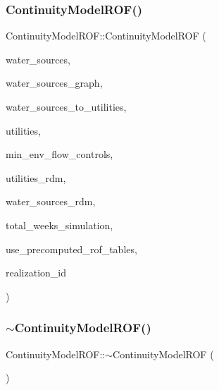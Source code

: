 \subsubsection{\texorpdfstring{Continuity\+Model\+R\+O\+F()}{ContinuityModelROF()}}
{\footnotesize\ttfamily Continuity\+Model\+R\+O\+F\+::\+Continuity\+Model\+R\+OF (\begin{DoxyParamCaption}\item[{vector$<$ \mbox{\hyperlink{classWaterSource}{Water\+Source}} $\ast$$>$}]{water\+\_\+sources,  }\item[{const \mbox{\hyperlink{classGraph}{Graph}} \&}]{water\+\_\+sources\+\_\+graph,  }\item[{const vector$<$ vector$<$ int $>$$>$ \&}]{water\+\_\+sources\+\_\+to\+\_\+utilities,  }\item[{vector$<$ \mbox{\hyperlink{classUtility}{Utility}} $\ast$$>$}]{utilities,  }\item[{vector$<$ \mbox{\hyperlink{classMinEnvFlowControl}{Min\+Env\+Flow\+Control}} $\ast$$>$}]{min\+\_\+env\+\_\+flow\+\_\+controls,  }\item[{vector$<$ double $>$ \&}]{utilities\+\_\+rdm,  }\item[{vector$<$ double $>$ \&}]{water\+\_\+sources\+\_\+rdm,  }\item[{unsigned long}]{total\+\_\+weeks\+\_\+simulation,  }\item[{const int}]{use\+\_\+precomputed\+\_\+rof\+\_\+tables,  }\item[{const unsigned long}]{realization\+\_\+id }\end{DoxyParamCaption})}

\mbox{\label{classContinuityModelROF_a0098bd7efa9e57a7ff0efc4c9b5aa340}} 
\subsubsection{\texorpdfstring{$\sim$\+Continuity\+Model\+R\+O\+F()}{~ContinuityModelROF()}}
{\footnotesize\ttfamily Continuity\+Model\+R\+O\+F\+::$\sim$\+Continuity\+Model\+R\+OF (\begin{DoxyParamCaption}{ }\end{DoxyParamCaption})\hspace{0.3cm}{\ttfamily [virtual]}}



